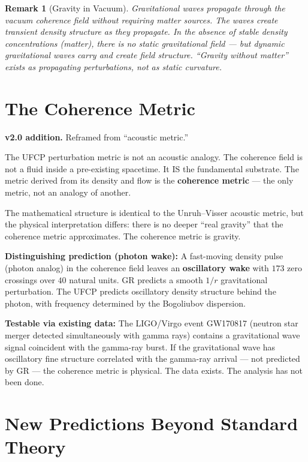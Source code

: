\documentclass[11pt, a4paper]{article}
\newtheorem{remark}{Remark}[section]
\begin{document}
\begin{remark}[Gravity in Vacuum]
Gravitational waves propagate through the vacuum coherence field without
requiring matter sources. The waves create transient density structure
as they propagate. In the absence of stable density concentrations
(matter), there is no static gravitational field --- but dynamic
gravitational waves carry and create field structure. ``Gravity without
matter'' exists as propagating perturbations, not as static curvature.
\end{remark}

\section{The Coherence Metric}
\label{sec:coherence-metric}

\textbf{v2.0 addition.} Reframed from ``acoustic metric.''

The UFCP perturbation metric is not an acoustic analogy. The coherence
field is not a fluid inside a pre-existing spacetime. It IS the
fundamental substrate. The metric derived from its density and flow
is the \textbf{coherence metric} --- the only metric, not an analogy
of another.

The mathematical structure is identical to the Unruh--Visser acoustic
metric, but the physical interpretation differs: there is no deeper
``real gravity'' that the coherence metric approximates. The coherence
metric is gravity.

\textbf{Distinguishing prediction (photon wake):}
A fast-moving density pulse (photon analog) in the coherence field
leaves an \textbf{oscillatory wake} with $173$ zero crossings over
$40$ natural units. GR predicts a smooth $1/r$ gravitational
perturbation. The UFCP predicts oscillatory density structure behind
the photon, with frequency determined by the Bogoliubov dispersion.

\textbf{Testable via existing data:} The LIGO/Virgo event GW170817
(neutron star merger detected simultaneously with gamma rays) contains
a gravitational wave signal coincident with the gamma-ray burst.
If the gravitational wave has oscillatory fine structure correlated
with the gamma-ray arrival --- not predicted by GR --- the coherence
metric is physical. The data exists. The analysis has not been done.

\section{New Predictions Beyond Standard Theory}
\label{sec:new-predictions}
\end{document}
